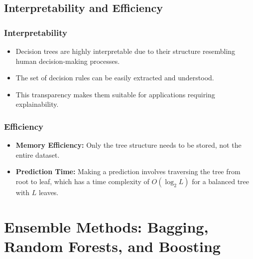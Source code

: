 \documentclass{article}
\begin{document}
\subsection{Interpretability and Efficiency}

\subsubsection{Interpretability}

\begin{itemize}
    \item Decision trees are highly interpretable due to their structure resembling human decision-making processes.
    \item The set of decision rules can be easily extracted and understood.
    \item This transparency makes them suitable for applications requiring explainability.
\end{itemize}

\subsubsection{Efficiency}

\begin{itemize}
    \item \textbf{Memory Efficiency:} Only the tree structure needs to be stored, not the entire dataset.
    \item \textbf{Prediction Time:} Making a prediction involves traversing the tree from root to leaf, which has a time complexity of $O(\log_2 L)$ for a balanced tree with $L$ leaves.
\end{itemize}

\section{Ensemble Methods: Bagging, Random Forests, and Boosting}
\end{document}
